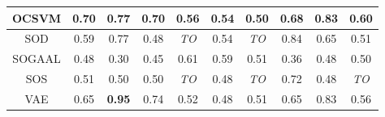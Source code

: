 \begin{table*}[!t]
\begin{tabular}{|c|c|c|c|c|c|c|c|c|c|}
\hline
                        OCSVM &                         0.70 &                      0.77 &                     0.70 &                    0.56 &                    0.54 &                   0.50 &                         0.68 &                     0.83 &                          0.60 \\
\hline
                        SOD &                         0.59 &                      0.77 &                     0.48 &             \textit{TO} &                    0.54 &            \textit{TO} &                         0.84 &                     0.65 &                          0.51 \\
\hline
                        SOGAAL &                         0.48 &                      0.30 &                     0.45 &                    0.61 &                    0.59 &                   0.51 &                         0.36 &                     0.48 &                          0.50 \\
\hline
                        SOS &                         0.51 &                      0.50 &                     0.50 &             \textit{TO} &                    0.48 &            \textit{TO} &                         0.72 &                     0.48 &                   \textit{TO} \\
\hline
                        VAE &                         0.65 &             \textbf{0.95} &                     0.74 &                    0.52 &                    0.48 &                   0.51 &                         0.65 &                     0.83 &                          0.56 \\
\hline
\end{tabular}
\end{table*}

